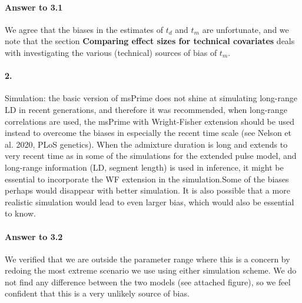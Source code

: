 \documentclass[11pt]{article}
\let\oldparagraph\paragraph
\renewcommand{\paragraph}[1]{\oldparagraph{#1}\mbox{}}
\begin{document}
\paragraph{Answer to 3.1}
We agree that the biases in the estimates of $t_d$ and $t_m$ are unfortunate, and we note that the section \textbf{Comparing effect sizes for technical covariates} deals with investigating the various (technical) sources of bias of $t_m$. 

\paragraph{2.}
Simulation: the basic version of msPrime does not shine at simulating long-range LD in recent generations, and therefore it was recommended, when long-range correlations are used, the msPrime with Wright-Fisher extension should be used instead to overcome the biases in especially the recent time scale (see Nelson et al. 2020, PLoS genetics). When the admixture duration is long and extends to very recent time as in some of the simulations for the extended pulse model, and long-range information (LD, segment length) is used in inference, it might be essential to incorporate the WF extension in the simulation.Some of the biases perhaps would disappear with better simulation. It is also possible that a more realistic simulation would lead to even larger bias, which would also be essential to know.

\paragraph{Answer to 3.2}
We verified that we are outside the parameter range where this is a concern by redoing the most extreme scenario we use using either simulation scheme. We do not find any difference between the two models (see attached figure), so we feel confident that this is a very unlikely source of bias.
\end{document}
